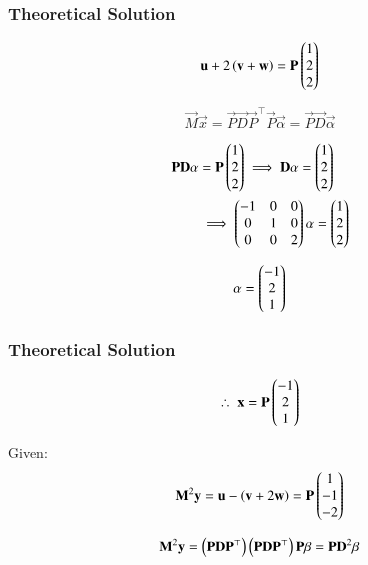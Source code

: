 \documentclass{beamer}
\begin{document}
\begin{frame}[fragile]
    \frametitle{Theoretical Solution}
\begin{equation}
\mathbf{u} + 2\left(\mathbf{v} + \mathbf{w}\right) = \mathbf{P} \begin{pmatrix}1 \\ 2 \\ 2\end{pmatrix}
\end{equation}

\begin{equation}
\vec{M}\vec{x} = \vec{P}\vec{D}\vec{P}^\top \vec{P}\vec{\alpha} = \vec{P}\vec{D}\vec{\alpha}
\end{equation}

\begin{align}
\mathbf{P}\mathbf{D}\mathbf{\alpha} &= \mathbf{P} \begin{pmatrix}1 \\ 2 \\ 2\end{pmatrix} \implies \mathbf{D}\mathbf{\alpha} = \begin{pmatrix}1 \\ 2 \\ 2\end{pmatrix} \\
&\implies \begin{pmatrix}-1 & 0 & 0 \\ 0 & 1 & 0 \\ 0 & 0 & 2\end{pmatrix} \mathbf{\alpha}  = \begin{pmatrix}1 \\ 2 \\ 2\end{pmatrix}
\end{align}

\begin{equation}
\mathbf{\alpha} = \begin{pmatrix}-1 \\ 2 \\ 1\end{pmatrix}
\end{equation}
\end{frame}

\begin{frame}[fragile]
    \frametitle{Theoretical Solution}
\begin{equation}
\therefore \; \mathbf{x} = \mathbf{P} \begin{pmatrix}-1 \\ 2 \\ 1\end{pmatrix}
\end{equation}


Given:
\begin{equation}
\mathbf{M}^2\mathbf{y} = \mathbf{u} - \left(\mathbf{v} + 2\mathbf{w}\right) = \mathbf{P} \begin{pmatrix}1 \\ -1 \\ -2\end{pmatrix}
\end{equation}

\begin{equation}
\mathbf{M}^2\mathbf{y} = \left(\mathbf{P}\mathbf{D}\mathbf{P}^\top\right)\left(\mathbf{P}\mathbf{D}\mathbf{P}^\top\right)\mathbf{P}\mathbf{\beta} = \mathbf{P}\mathbf{D}^2\mathbf{\beta}
\end{equation}
\end{frame}
\end{document}
